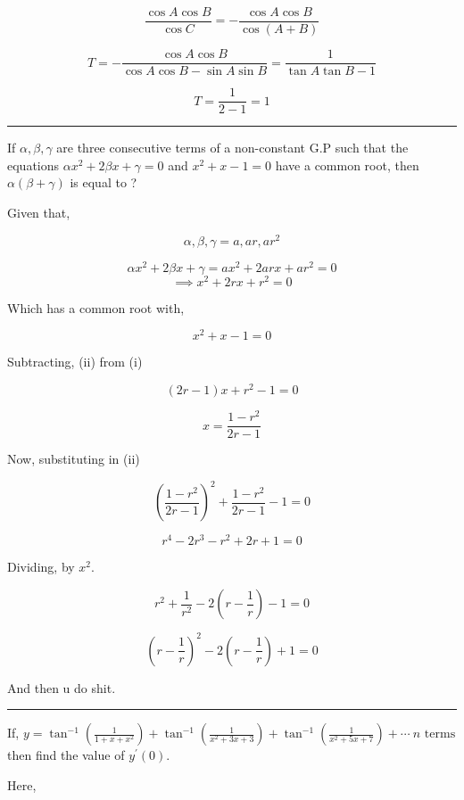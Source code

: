 \documentclass[twocolumn]{article}
\begin{document}
\begin{CJK*}{UTF8}{gbsn}
\[
    \frac{\cos A \cos B}{\cos C} = - \frac{\cos A \cos B}{\cos (A + B)}
\]

\[
    T = -\frac{\cos A \cos B}{\cos A \cos B - \sin A \sin B} = \frac{1}{\tan A \tan B -1}
\]

\[
    T = \frac{1}{2-1} = 1 
\]

\hrule

\begin{question}
    If \(\alpha, \beta, \gamma\) are three consecutive terms of a non-constant G.P such that the equations \(\alpha x^{2} + 2\beta x + \gamma = 0\) and \(x^{2} + x -1 = 0\) have a common root, then \(\alpha (\beta+ \gamma)\) is equal to ?    
\end{question}

Given that, 

\[
    \alpha , \beta, \gamma = a, ar, ar^{2} 
\]

\[
    \alpha x^{2} + 2\beta x + \gamma = ax^{2} + 2arx + ar^{2} = 0
\]
\[
    \implies x^{2} + 2rx + r^{2} = 0 \tag{i}
\]

Which has a common root with, 

\[
    x^{2} + x - 1 = 0 \tag{ii}
\]

Subtracting, (ii) from (i)

\[
    (2r - 1)x + r^{2} - 1 = 0
\]

\[
    x = \frac{1-r^{2}}{2r-1}
\]

Now, substituting in (ii)

\[
    (\frac{1-r^{2}}{2r-1})^{2} + \frac{1-r^{2}}{2r-1} - 1 = 0
\]

\[
    r ^{4} - 2r ^{3} - r^{2} + 2r + 1 = 0
\]

Dividing, by \(x^{2}\).  

\[
    r^{2} + \frac{1}{r^{2}} - 2(r - \frac{1}{r}) - 1 = 0
\]

\[
    (r - \frac{1}{r})^{2} - 2(r - \frac{1}{r}) + 1 = 0
\]

And then u do shit. 

\vspace{0.1in}

\hrule 

\begin{question}
    If, \( \displaystyle y = \tan ^{-1} (\frac{1}{1+x+x^{2}}) + \tan ^{-1} (\frac{1}{x^{2} + 3x + 3}) + \tan ^{-1} (\frac{1}{x^{2} +5x + 7 }) + \cdots\ n\text{ terms} \) then find the value of \(y^{\prime} (0)\).   
\end{question}

Here, 


\end{CJK*}
\end{document}
